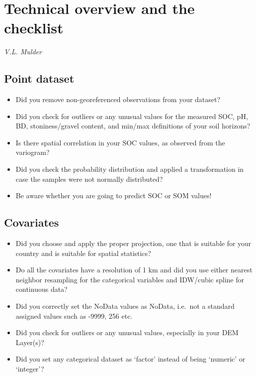 \documentclass[10pt,b5paper,]{book}
\providecommand{\tightlist}{%
  \setlength{\itemsep}{0pt}\setlength{\parskip}{0pt}}
\theoremstyle{definition}
\theoremstyle{definition}
\theoremstyle{definition}
\theoremstyle{remark}
\begin{document}
\hypertarget{technical-overview-and-the-checklist}{%
\chapter{Technical overview and the
checklist}\label{technical-overview-and-the-checklist}}

\emph{V.L. Mulder}

\hypertarget{point-dataset}{%
\section{Point dataset}\label{point-dataset}}

\begin{itemize}
\tightlist
\item
  Did you remove non-georeferenced observations from your dataset?
\item
  Did you check for outliers or any unusual values for the measured SOC,
  pH, BD, stoniness/gravel content, and min/max definitions of your soil
  horizons?
\item
  Is there spatial correlation in your SOC values, as observed from the
  variogram?
\item
  Did you check the probability distribution and applied a
  transformation in case the samples were not normally distributed?
\item
  Be aware whether you are going to predict SOC or SOM values!
\end{itemize}

\hypertarget{covariates-1}{%
\section{Covariates}\label{covariates-1}}

\begin{itemize}
\tightlist
\item
  Did you choose and apply the proper projection, one that is suitable
  for your country and is suitable for spatial statistics?
\item
  Do all the covariates have a resolution of 1 km and did you use either
  nearest neighbor resampling for the categorical variables and
  IDW/cubic spline for continuous data?
\item
  Did you correctly set the NoData values as NoData, i.e.~not a standard
  assigned values such as -9999, 256 etc.
\item
  Did you check for outliers or any unusual values, especially in your
  DEM Layer(s)?
\item
  Did you set any categorical dataset as `factor' instead of being
  `numeric' or `integer'?
\end{itemize}
\end{document}
